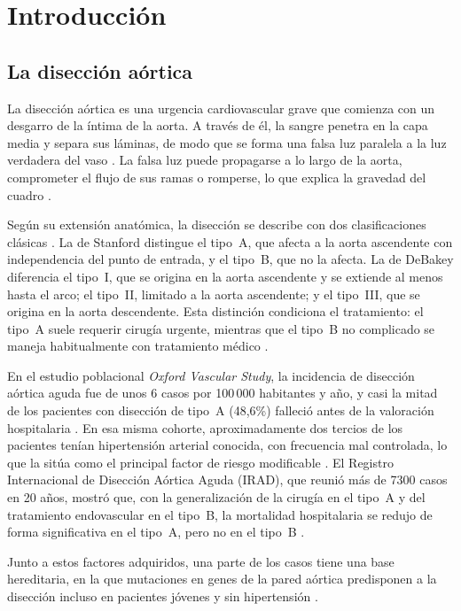 \section{Introducción}


\subsection{La disección aórtica}

La disección aórtica es una urgencia cardiovascular grave que comienza con un desgarro de la íntima de la aorta. A través de él, la sangre penetra en la capa media y separa sus láminas, de modo que se forma una falsa luz paralela a la luz verdadera del vaso \cite{Nienaber2016}. La falsa luz puede propagarse a lo largo de la aorta, comprometer el flujo de sus ramas o romperse, lo que explica la gravedad del cuadro \cite{Nienaber2016}.

Según su extensión anatómica, la disección se describe con dos clasificaciones clásicas \cite{Isselbacher2022}. La de Stanford distingue el tipo~A, que afecta a la aorta ascendente con independencia del punto de entrada, y el tipo~B, que no la afecta. La de DeBakey diferencia el tipo~I, que se origina en la aorta ascendente y se extiende al menos hasta el arco; el tipo~II, limitado a la aorta ascendente; y el tipo~III, que se origina en la aorta descendente. Esta distinción condiciona el tratamiento: el tipo~A suele requerir cirugía urgente, mientras que el tipo~B no complicado se maneja habitualmente con tratamiento médico \cite{Isselbacher2022}.

En el estudio poblacional \textit{Oxford Vascular Study}, la incidencia de disección aórtica aguda fue de unos 6 casos por 100\,000 habitantes y año, y casi la mitad de los pacientes con disección de tipo~A (48,6\%) falleció antes de la valoración hospitalaria \cite{Howard2013}. En esa misma cohorte, aproximadamente dos tercios de los pacientes tenían hipertensión arterial conocida, con frecuencia mal controlada, lo que la sitúa como el principal factor de riesgo modificable \cite{Howard2013}. El Registro Internacional de Disección Aórtica Aguda (IRAD), que reunió más de 7300 casos en 20 años, mostró que, con la generalización de la cirugía en el tipo~A y del tratamiento endovascular en el tipo~B, la mortalidad hospitalaria se redujo de forma significativa en el tipo~A, pero no en el tipo~B \cite{Evangelista2018}.

Junto a estos factores adquiridos, una parte de los casos tiene una base hereditaria, en la que mutaciones en genes de la pared aórtica predisponen a la disección incluso en pacientes jóvenes y sin hipertensión \cite{Nienaber2016,Pinard2019}.

